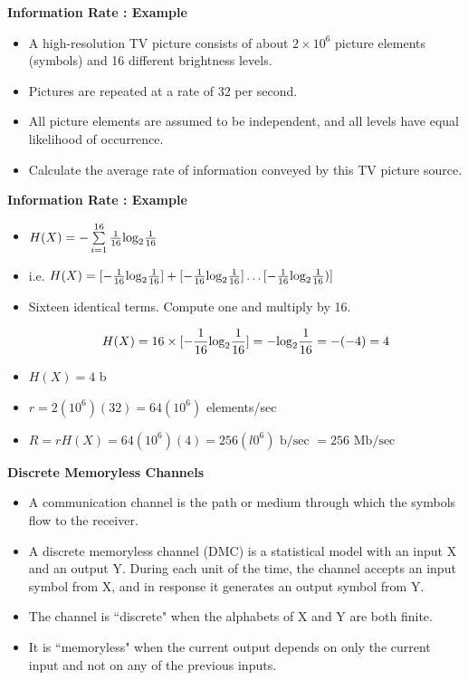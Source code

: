 \documentclass[a4]{beamer}
\begin{document}

\noindent \textbf{Information Rate : Example}
\begin{itemize}

\item A high-resolution TV picture consists of about $2 \times 10^6$ picture elements (symbols) and 16
different brightness levels. \item Pictures are repeated at a rate of 32 per second. \item All picture elements
are assumed to be independent, and all levels have equal likelihood of occurrence. \item Calculate the
average rate of information conveyed by this TV picture source.

\end{itemize}



\noindent \textbf{Information Rate : Example}
\begin{itemize}
\item $H(X) = - \sum \limits^{16}_{i=1} {1\over16} \mbox{log}_2{1\over16}$ \bigskip

\item i.e. $H(X) = [ -{1\over16} \mbox{log}_2{1\over16} ] + [- {1\over16} \mbox{log}_2{1\over16} ] \ldots [ -{1\over16} \mbox{log}_2{1\over16}) ] $ \bigskip
\item Sixteen identical terms. Compute one and multiply by 16.

\[ H(X) = 16 \times [ -{1\over16} \mbox{log}_2{1\over16} ]  = -\mbox{log}_2{1\over16} = -(-4) = 4\] \bigskip
\item $H(X)= 4$ b
\item $r =  2(10^6)(32) = 64(10^6)$ elements/sec \bigskip

\item $R = rH(X) = 64(10^6)(4) = 256(l0^6) \mbox{ b/sec } = 256 \mbox{ Mb/sec }$ \bigskip
\end{itemize}

 \noindent \textbf{Discrete Memoryless Channels}
\begin{itemize}
\item A communication channel is the path or medium through which the symbols flow to the receiver. \item A discrete memoryless channel (DMC) is a statistical model with an input X and an output Y.
During each unit of the time, the channel accepts an input symbol from X, and in
response it generates an output symbol from Y. \item  The channel is ``discrete" when the alphabets of X and
Y are both finite.\item It is ``memoryless" when the current output depends on only the current input and
not on any of the previous inputs.\end{itemize}
\end{document}
